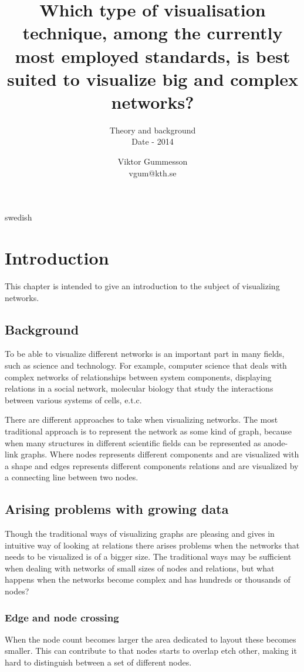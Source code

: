 \documentclass[a4paper,11pt]{kth-mag}
\title{Which type of visualisation technique, among the currently most employed standards, is best suited to visualize big and complex networks?}
\subtitle{Theory and background\\Date - 2014}
\author{Viktor Gummesson\\ \lowercase{vgum@kth.se}}
\begin{document}
\frontmatter
\pagestyle{empty}
\removepagenumbers
\maketitle
{}
\begin{abstract}
\end{abstract}
\clearpage
\begin{foreignabstract}{swedish}
\end{foreignabstract}
\clearpage
\tableofcontents*
\mainmatter
\pagestyle{newchap}
\chapter{Introduction}
This chapter is intended to give an introduction to the subject of visualizing networks.
\section{Background}
To be able to visualize different networks is an important part in many fields, such as science and technology. For example, computer science that deals with complex networks of relationships between system components,
displaying relations in a social network, molecular biology that study the interactions between various systems of cells, e.t.c.

There are different approaches to take when visualizing networks. The most traditional approach is to represent the network as some kind of graph, because when many structures in different scientific fields can be represented
as anode-link graphs. Where nodes represents different components and are visualized with a shape and edges represents different components relations and are visualized by a connecting line between two nodes.

\section{Arising problems with growing data}
Though the traditional ways of visualizing graphs are pleasing and gives in intuitive way of looking at relations there arises problems when the networks that needs to be visualized is of a bigger size. The traditional
ways may be sufficient when dealing with networks of small sizes of nodes and relations, but what happens when the networks become complex and has hundreds or thousands of nodes?
\subsection{Edge and node crossing}
When the node count becomes larger the area dedicated to layout these becomes smaller. This can contribute to that nodes starts to overlap etch other, making it hard to distinguish between a set of different nodes.
\end{document}
